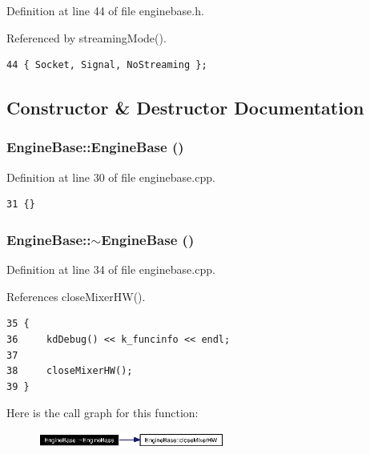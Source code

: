 Definition at line 44 of file enginebase.h.

Referenced by streaming\-Mode().



\footnotesize\begin{verbatim}44 { Socket, Signal, NoStreaming };
\end{verbatim}\normalsize 


\subsection{Constructor \& Destructor Documentation}
\subsubsection{\setlength{\rightskip}{0pt plus 5cm}Engine\-Base::Engine\-Base ()}\label{classEngineBase_EngineBasea0}




Definition at line 30 of file enginebase.cpp.



\footnotesize\begin{verbatim}31 {}
\end{verbatim}\normalsize 
{}
\subsubsection{\setlength{\rightskip}{0pt plus 5cm}Engine\-Base::$\sim${\bf Engine\-Base} ()\hspace{0.3cm}{\tt  [virtual]}}\label{classEngineBase_EngineBasea1}




Definition at line 34 of file enginebase.cpp.

References close\-Mixer\-HW().



\footnotesize\begin{verbatim}35 {
36     kdDebug() << k_funcinfo << endl;
37 
38     closeMixerHW();
39 }
\end{verbatim}\normalsize 


Here is the call graph for this function:\begin{figure}[H]
\begin{center}
\leavevmode
\includegraphics[width=174pt]{classEngineBase_EngineBasea1_cgraph}
\end{center}
\end{figure}
